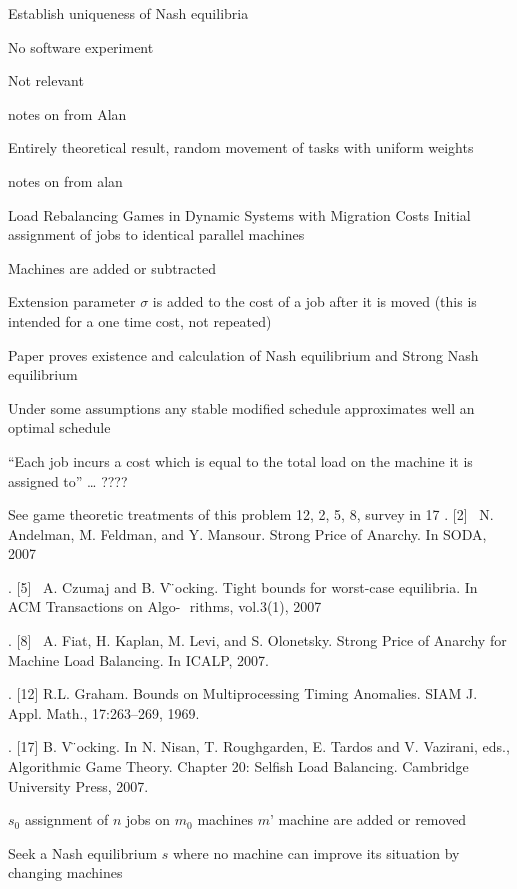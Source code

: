 \documentclass{article}
\begin{document}
Establish uniqueness of Nash equilibria

No software experiment

Not relevant






\cite{7967109}

notes on
\cite{7967109}
from Alan

Entirely theoretical result, random movement of tasks with uniform weights



\cite{BELIKOVETSKY201616}

notes on
\cite{BELIKOVETSKY201616}
from alan

Load Rebalancing Games in Dynamic Systems with Migration Costs 
Initial assignment of jobs to identical parallel machines

Machines are added or subtracted

Extension parameter $\sigma$ is added to the cost of a job after it is moved (this is intended for a one time cost, not repeated)

Paper proves existence and calculation of Nash equilibrium and Strong Nash equilibrium

Under some assumptions any stable modified schedule approximates well an optimal schedule

“Each job incurs a cost which is equal to the total load on the machine it is assigned to” … ????

See game theoretic treatments of this problem 12, 2, 5, 8, survey in 17
	.	[2]  N. Andelman, M. Feldman, and Y. Mansour. Strong Price of Anarchy. In SODA, 2007 

	.	[5]  A. Czumaj and B. V ̈ocking. Tight bounds for worst-case equilibria. In ACM Transactions on Algo-  rithms, vol.3(1), 2007 

	.	[8]  A. Fiat, H. Kaplan, M. Levi, and S. Olonetsky. Strong Price of Anarchy for Machine Load Balancing. In ICALP, 2007. 

	.	[12] R.L. Graham. Bounds on Multiprocessing Timing Anomalies. SIAM J. Appl. Math., 17:263–269, 1969. 

	.	[17] B. V ̈ocking. In N. Nisan, T. Roughgarden, E. Tardos and V. Vazirani, eds., Algorithmic Game Theory. Chapter 20: Selfish Load Balancing. Cambridge University Press, 2007. 

$s_0$ assignment of $n$ jobs on $m_0$ machines
$m’$ machine are added or removed

Seek a Nash equilibrium $s$ where no machine can improve its situation by changing machines
\end{document}
